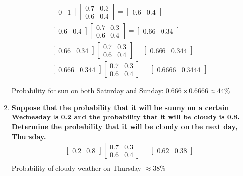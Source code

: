 \documentclass[a4paper]{article}
\begin{document}
\begin{enumerate}
	\begin{equation}
	\begin{aligned}
		\begin{bmatrix} 0& 1 \end{bmatrix}
		\begin{bmatrix} 0.7& 0.3 \\ 0.6& 0.4 \end{bmatrix} = 
		\begin{bmatrix} 0.6& 0.4 \end{bmatrix} \\
		\begin{bmatrix} 0.6& 0.4 \end{bmatrix} \begin{bmatrix} 0.7& 0.3 \\ 0.6& 0.4 \end{bmatrix} = \begin{bmatrix} 0.66& 0.34 \end{bmatrix} \\
		 \begin{bmatrix} 0.66& 0.34 \end{bmatrix}\begin{bmatrix} 0.7& 0.3 \\ 0.6& 0.4 \end{bmatrix} = \begin{bmatrix} 0.666& 0.344 \end{bmatrix} \\
		 \begin{bmatrix} 0.666& 0.344 \end{bmatrix}\begin{bmatrix} 0.7& 0.3 \\ 0.6& 0.4 \end{bmatrix}  =  \begin{bmatrix} 0.6666& 0.3444 \end{bmatrix}
	\end{aligned}
	\end{equation}

	Probability for sun on both Saturday and Sunday: $0.666 \times 0.6666 \approx 44\%$

	\item \textbf{Suppose that the probability that it will be sunny on a certain Wednesday is 0.2 and the probability that it will be cloudy is 0.8. Determine the probability that it will be cloudy on the next day, Thursday.
	} \\
	\begin{equation}
	\begin{aligned}
	\begin{bmatrix} 0.2& 0.8 \end{bmatrix}
		\begin{bmatrix} 0.7& 0.3 \\ 0.6& 0.4 \end{bmatrix} = \begin{bmatrix} 0.62& 0.38 \end{bmatrix} \\
	\end{aligned}
	\end{equation}
	Probability of cloudy weather on Thursday $\approx 38\%$ 



\end{enumerate}
\end{document}
